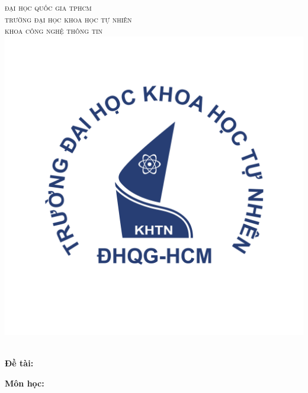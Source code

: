\begin{titlepage}
    \newcommand{\HRule}{\rule{\linewidth}{0.5mm}}
    \centering
    
    \textsc{\LARGE đại học quốc gia tphcm}\\[0.25cm]
    \textsc{\LARGE trường đại học khoa học tự nhiên}\\[0.25cm]
    \textsc{\LARGE khoa công nghệ thông tin}\\[0.25cm]
    
    \includegraphics[scale=.25]{img/hcmus-logo.png}
    
    \vspace*{\fill} %
    
    {
    \huge{\bfseries{\reporttitle}}\\[0.5cm]
    \Large{\bfseries{Đề tài: \reportname}}
    }\\[0.3cm]
    
    \vspace*{\fill} %
    
    \textbf{\large Môn học: \coursename}\\[0.5cm]
    

\end{titlepage}
